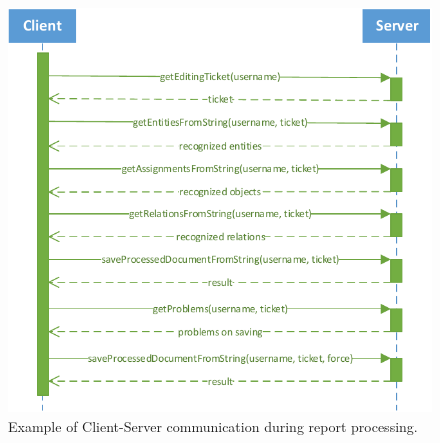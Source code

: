 \begin{figure}[!htb]
        \centering
        \includegraphics[width=\textwidth]{Images/ClientServerCommunication}
        \caption{Example of Client-Server communication during report processing.}
        \label{fig:ClientServerCommunication}
\end{figure}
